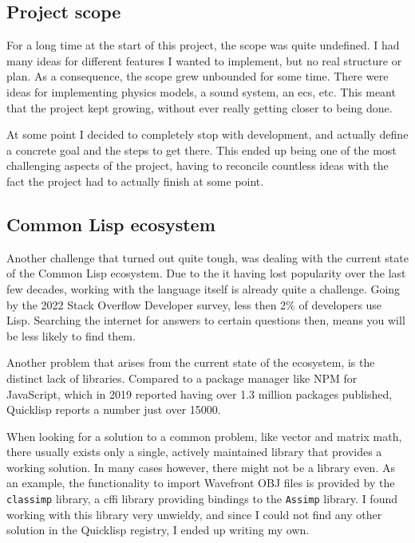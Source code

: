 
\subsection{Project scope}

For a long time at the start of this project,
the scope was quite undefined.
I had many ideas for different features I wanted to implement,
but no real structure or plan.
As a consequence,
the scope grew unbounded for some time.
There were ideas for implementing physics models,
a sound system,
an \ac{ecs}, etc.
This meant that the project kept growing,
without ever really getting closer to being done.

At some point I decided to completely stop with development,
and actually define a concrete goal and the steps to get there.
This ended up being one of the most challenging aspects of the project,
having to reconcile countless ideas with the fact the project had to actually finish at some point.

\subsection{Common Lisp ecosystem}

Another challenge that turned out quite tough,
was dealing with the current state of the Common Lisp ecosystem.
Due to the it having lost popularity over the last few decades,
working with the language itself is already quite a challenge.
Going by the 2022 Stack Overflow Developer survey,
less then 2\% of developers use Lisp.
Searching the internet for answers to certain questions then,
means you will be less likely to find them.

Another problem that arises from the current state of the ecosystem,
is the distinct lack of libraries.
Compared to a package manager like NPM for JavaScript,
which in 2019 reported having over 1.3 million packages published\cite{npm},
Quicklisp reports a number just over 15000\cite{quicklisp}.

When looking for a solution to a common problem,
like vector and matrix math,
there usually exists only a single,
actively maintained library that provides a working solution.
In many cases however,
there might not be a library even.
As an example,
the functionality to import Wavefront OBJ files is provided by the \texttt{classimp} library,
a \ac{cffi} library providing bindings to the \texttt{Assimp} library.
I found working with this library very unwieldy,
and since I could not find any other solution in the Quicklisp registry,
I ended up writing my own.


